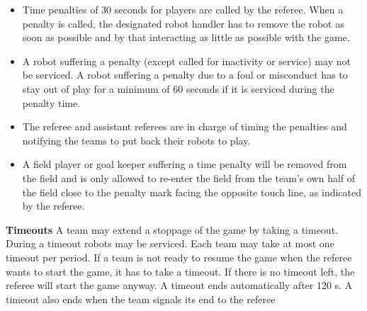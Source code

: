 \begin{itemize}
\item Time penalties of 30 seconds for players are called by the referee. When a penalty is called, the designated robot handler has to remove the robot as soon as possible and by that interacting as little as possible with the game. 
\item A robot suffering a penalty (except called for inactivity or service) may not be serviced. A robot suffering a penalty due to a foul or misconduct has to stay out of play for a minimum of 60 seconds if it is serviced during the penalty time.
\item The referee and assistant referees are in charge of timing the penalties and notifying the teams to put back their robots to play.
\item A field player or goal keeper suffering a time penalty will be removed from the field and is only allowed to re-enter the field from the team's own half of the field close to the penalty mark facing the opposite touch line, as indicated by the referee.
\end{itemize}

\bigskip

{\bfseries Timeouts}
A team may extend a stoppage of the game by taking a timeout. During a timeout
robots may be serviced. Each team may take at most one timeout per period. If a team is not ready to resume the game when the referee wants to start the game, it has to take a timeout. If there is no timeout left, the referee will start
the game anyway. A timeout ends automatically after 120 s. A timeout also ends when the team signals its end to the referee

\bigskip

\bigskip

